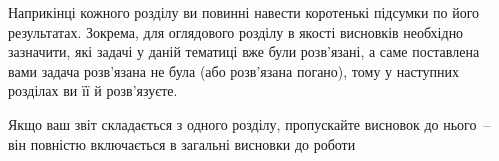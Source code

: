 










\chapconclude{\ref{chap:review}}

Наприкінці кожного розділу ви повинні навести коротенькі підсумки по його 
результатах. Зокрема, для оглядового розділу в якості висновків необхідно 
зазначити, які задачі у даній тематиці вже були розв'язані, а саме 
поставлена вами задача розв'язана не була (або розв'язана погано), тому у 
наступних розділах ви її й розв'язуєте.

Якщо ваш звіт складається з одного розділу, пропускайте висновок до 
нього~-- він повністю включається в загальні висновки до роботи

